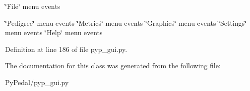 \char`\"{}File\char`\"{} menu events 

\char`\"{}Pedigree\char`\"{} menu events \char`\"{}Metrics\char`\"{} menu events \char`\"{}Graphics\char`\"{} menu events \char`\"{}Settings\char`\"{} menu events \char`\"{}Help\char`\"{} menu events 

Definition at line 186 of file pyp\_\-gui.py.



The documentation for this class was generated from the following file:\begin{DoxyCompactItemize}
\item 
PyPedal/pyp\_\-gui.py\end{DoxyCompactItemize}

